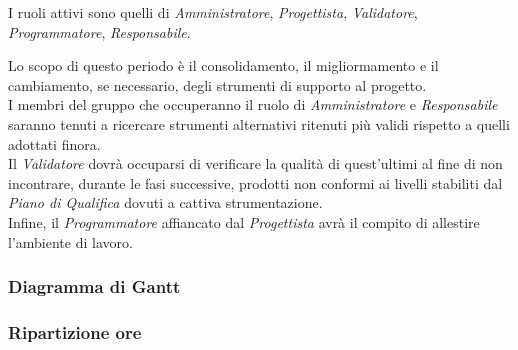 I ruoli attivi sono quelli di \textit{Amministratore}, \textit{Progettista}, \textit{Validatore}, \textit{Programmatore}, \textit{Responsabile}.


Lo scopo di questo periodo \`e il consolidamento, il migliormamento e il cambiamento, se necessario, degli strumenti di supporto al progetto.\\
I membri del gruppo che occuperanno il ruolo di \textit{Amministratore} e \textit{Responsabile} saranno tenuti a ricercare strumenti alternativi ritenuti pi\`u validi rispetto a quelli adottati finora.\\
Il \textit{Validatore} dovr\`a occuparsi di verificare la qualit\`a di quest'ultimi al fine di non incontrare, durante le fasi successive, prodotti non conformi ai livelli stabiliti dal \textit{Piano di Qualifica} dovuti a cattiva strumentazione.\\
Infine, il \textit{Programmatore} affiancato dal \textit{Progettista} avr\`a il compito di allestire l'ambiente di lavoro.

\subsubsection{Diagramma di Gantt}

\subsubsection{Ripartizione ore}

